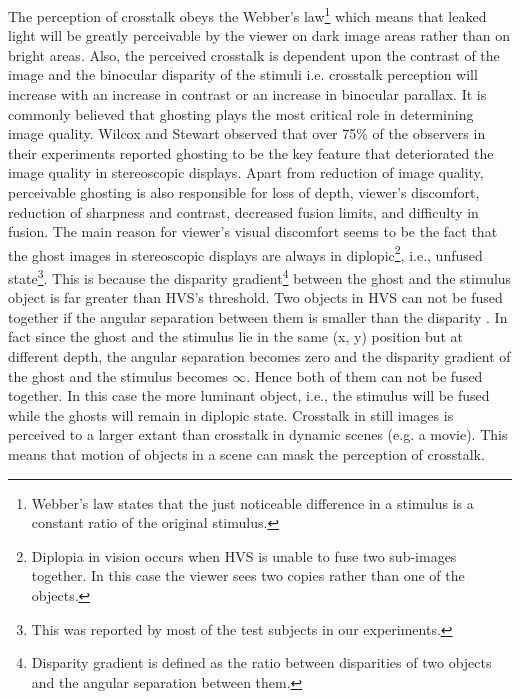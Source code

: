 The perception of crosstalk obeys the Webber's law\footnote{Webber's law states that the just noticeable difference in a stimulus is a constant ratio of the original stimulus.} which means that leaked light will be greatly perceivable by the viewer on dark image areas rather than on bright areas. Also, the perceived crosstalk is dependent upon the contrast of the image and the binocular disparity of the stimuli i.e. crosstalk perception will increase with an increase in contrast or an increase in binocular parallax. It is commonly believed that ghosting plays the most critical role in determining image quality. Wilcox and Stewart \cite{wilcox2003determinants} observed that over 75\% of the observers in their experiments reported ghosting to be the key feature that deteriorated the image quality in stereoscopic displays. Apart from reduction of image quality, perceivable ghosting is also responsible for loss of depth, viewer's discomfort, reduction of sharpness and contrast, decreased fusion limits, and difficulty in fusion. The main reason for viewer's visual discomfort seems to be the fact that the ghost images in stereoscopic displays are always in diplopic\footnote{Diplopia in vision occurs when HVS is unable to fuse two sub-images together. In this case the viewer sees two copies rather than one of the objects.}, i.e., unfused state\footnote{This was reported by most of the test subjects in our experiments.}. This is because the disparity gradient\footnote{Disparity gradient is defined as the ratio between disparities of two objects and the angular separation between them.} between the ghost and the stimulus object is far greater than HVS's threshold. Two objects in HVS can not be fused together if the angular separation between them is smaller than the disparity \cite{burt1980disparity}. In fact since the ghost and the stimulus lie in the same (x, y) position but at different depth, the angular separation becomes zero and the disparity gradient of the ghost and the stimulus becomes $\infty$. Hence both of them can not be fused together. In this case the more luminant object, i.e., the stimulus will be fused while the ghosts will remain in diplopic state. Crosstalk in still images is perceived to a larger extant than crosstalk in dynamic scenes (e.g. a movie). This means that motion of objects in a scene can mask the perception of crosstalk.

